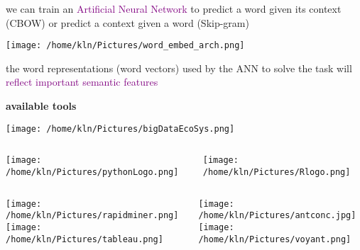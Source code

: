 \documentclass[8pt]{beamer}
\begin{document}
\begin{frame}%
we can train an \textcolor{purple}{Artificial Neural Network} to predict a word given its context (CBOW) or predict a context given a word (Skip-gram)\\
\medskip
\begin{center}
	\texttt{[image: /home/kln/Pictures/word\_embed\_arch.png]}
\end{center}
the word representations (word vectors) used by the ANN to solve the task will \textcolor{purple}{reflect important semantic features} 
\end{frame}


\begin{frame}
	\begin{center}
		\textbf{available tools}
	\end{center}
\end{frame}

\begin{frame}{}
\begin{center}
\texttt{[image: /home/kln/Pictures/bigDataEcoSys.png]} 
\end{center}
\end{frame}

\begin{frame}
\begin{columns}
\begin{column}{0.5\textwidth}
   \begin{center}
		\texttt{[image: /home/kln/Pictures/pythonLogo.png]}   
   \end{center}
\end{column}
\begin{column}{0.5\textwidth}
    \begin{center}
		\texttt{[image: /home/kln/Pictures/Rlogo.png]}    
    \end{center}
\end{column}
\end{columns}
\end{frame}

\begin{frame}
\begin{columns}
\begin{column}{0.5\textwidth}
   \begin{center}
    \texttt{[image: /home/kln/Pictures/rapidminer.png]}\\
    \bigskip
    \texttt{[image: /home/kln/Pictures/tableau.png]}
    \end{center}
\end{column}
\begin{column}{0.5\textwidth}
    \begin{center}
    \texttt{[image: /home/kln/Pictures/antconc.jpg]}\\
    \bigskip
    \texttt{[image: /home/kln/Pictures/voyant.png]}
    \end{center}
\end{column}
\end{columns}
\end{frame}
\end{document}
